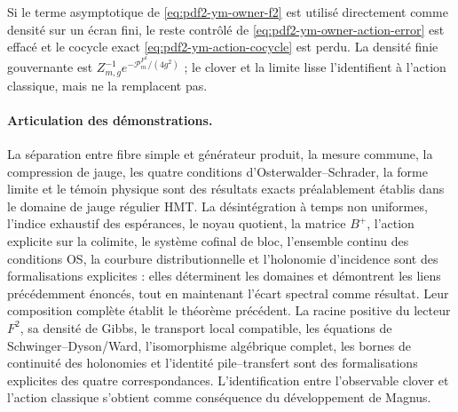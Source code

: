 \begin{falsifier}
Si le terme asymptotique de \eqref{eq:pdf2-ym-owner-f2} est utilisé directement comme densité sur un écran fini, le reste contrôlé de \eqref{eq:pdf2-ym-owner-action-error} est effacé et le cocycle exact \eqref{eq:pdf2-ym-action-cocycle} est perdu. La densité finie gouvernante est $Z_{m,g}^{-1}e^{-\mathcal P_m^{F^2}/(4g^2)}$ ; le clover et la limite lisse l'identifient à l'action classique, mais ne la remplacent pas.
\end{falsifier}

\paragraph{Articulation des démonstrations.}
La séparation entre fibre simple et générateur produit, la mesure commune, la compression de jauge, les quatre conditions d'Osterwalder--Schrader, la forme limite et le témoin physique sont des résultats exacts préalablement établis dans le domaine de jauge régulier HMT. La désintégration à temps non uniformes, l'indice exhaustif des espérances, le noyau quotient, la matrice $B^+$, l'action explicite sur la colimite, le système cofinal de bloc, l'ensemble continu des conditions OS, la courbure distributionnelle et l'holonomie d'incidence sont des formalisations explicites : elles déterminent les domaines et démontrent les liens précédemment énoncés, tout en maintenant l'écart spectral comme résultat. Leur composition complète établit le théorème précédent.
La racine positive du lecteur $F^2$, sa densité de Gibbs, le transport local compatible, les équations de Schwinger--Dyson/Ward, l'isomorphisme algébrique complet, les bornes de continuité des holonomies et l'identité pile--transfert sont des formalisations explicites des quatre correspondances. L'identification entre l'observable clover et l'action classique s'obtient comme conséquence du développement de Magnus.
